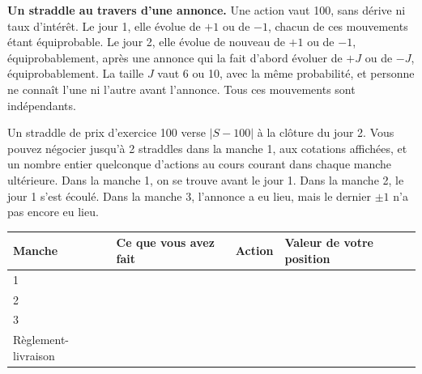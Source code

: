 \begin{question}\label{iq:iv2:played-games:9}
\textbf{Un straddle au travers d'une annonce.} Une action vaut 100, sans dérive ni taux d'intérêt. Le jour 1, elle évolue de $+1$ ou de $-1$, chacun de ces mouvements étant équiprobable. Le jour 2, elle évolue de nouveau de $+1$ ou de $-1$, équiprobablement, après une annonce qui la fait d'abord évoluer de $+J$ ou de $-J$, équiprobablement. La taille $J$ vaut 6 ou 10, avec la même probabilité, et personne ne connaît l'une ni l'autre avant l'annonce. Tous ces mouvements sont indépendants.

Un straddle de prix d'exercice 100 verse $|S - 100|$ à la clôture du jour 2. Vous pouvez négocier jusqu'à 2 straddles dans la manche 1, aux cotations affichées, et un nombre entier quelconque d'actions au cours courant dans chaque manche ultérieure. Dans la manche 1, on se trouve avant le jour 1. Dans la manche 2, le jour 1 s'est écoulé. Dans la manche 3, l'annonce a eu lieu, mais le dernier $\pm 1$ n'a pas encore eu lieu.

\medskip
\begin{tabular}{@{}l|p{4cm}|l|l@{}}
Manche & Ce que vous avez fait & Action & Valeur de votre position \\ \hline
1 & & & \\[8pt]\hline
2 & & & \\[8pt]\hline
3 & & & \\[8pt]\hline
Règlement-livraison & & & \\[8pt]\hline
\end{tabular}
\end{question}
\vfill\clearpage

